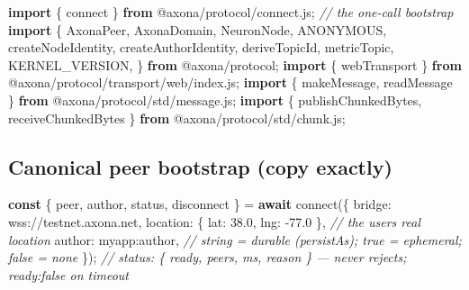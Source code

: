 \documentclass[
  nobib]{tufte-handout}
\newenvironment{Shaded}{}{}
\newcommand{\CommentTok}[1]{\textcolor[rgb]{0.38,0.63,0.69}{\textit{#1}}}
\newcommand{\ControlFlowTok}[1]{\textcolor[rgb]{0.00,0.44,0.13}{\textbf{#1}}}
\newcommand{\DataTypeTok}[1]{\textcolor[rgb]{0.56,0.13,0.00}{#1}}
\newcommand{\FloatTok}[1]{\textcolor[rgb]{0.25,0.63,0.44}{#1}}
\newcommand{\FunctionTok}[1]{\textcolor[rgb]{0.02,0.16,0.49}{#1}}
\newcommand{\ImportTok}[1]{\textcolor[rgb]{0.00,0.50,0.00}{\textbf{#1}}}
\newcommand{\KeywordTok}[1]{\textcolor[rgb]{0.00,0.44,0.13}{\textbf{#1}}}
\newcommand{\NormalTok}[1]{#1}
\newcommand{\OperatorTok}[1]{\textcolor[rgb]{0.40,0.40,0.40}{#1}}
\newcommand{\StringTok}[1]{\textcolor[rgb]{0.25,0.44,0.63}{#1}}
\newcounter{none} %
\begin{document}
\begin{Shaded}
\begin{Highlighting}[]
\ImportTok{import}\NormalTok{ \{ connect \} }\ImportTok{from} \StringTok{\textquotesingle{}@axona/protocol/connect.js\textquotesingle{}}\OperatorTok{;}   \CommentTok{// the one{-}call bootstrap}
\ImportTok{import}\NormalTok{ \{}
\NormalTok{  AxonaPeer}\OperatorTok{,}\NormalTok{ AxonaDomain}\OperatorTok{,}\NormalTok{ NeuronNode}\OperatorTok{,}\NormalTok{ ANONYMOUS}\OperatorTok{,}
\NormalTok{  createNodeIdentity}\OperatorTok{,}\NormalTok{ createAuthorIdentity}\OperatorTok{,}
\NormalTok{  deriveTopicId}\OperatorTok{,}\NormalTok{ metricTopic}\OperatorTok{,}\NormalTok{ KERNEL\_VERSION}\OperatorTok{,}
\NormalTok{\} }\ImportTok{from} \StringTok{\textquotesingle{}@axona/protocol\textquotesingle{}}\OperatorTok{;}
\ImportTok{import}\NormalTok{ \{ webTransport \} }\ImportTok{from} \StringTok{\textquotesingle{}@axona/protocol/transport/web/index.js\textquotesingle{}}\OperatorTok{;}
\ImportTok{import}\NormalTok{ \{ makeMessage}\OperatorTok{,}\NormalTok{ readMessage \} }\ImportTok{from} \StringTok{\textquotesingle{}@axona/protocol/std/message.js\textquotesingle{}}\OperatorTok{;}
\ImportTok{import}\NormalTok{ \{ publishChunkedBytes}\OperatorTok{,}\NormalTok{ receiveChunkedBytes \} }\ImportTok{from} \StringTok{\textquotesingle{}@axona/protocol/std/chunk.js\textquotesingle{}}\OperatorTok{;}
\end{Highlighting}
\end{Shaded}

\subsection{Canonical peer bootstrap (copy
exactly)}\label{canonical-peer-bootstrap-copy-exactly}

\begin{Shaded}
\begin{Highlighting}[]
\KeywordTok{const}\NormalTok{ \{ peer}\OperatorTok{,}\NormalTok{ author}\OperatorTok{,}\NormalTok{ status}\OperatorTok{,}\NormalTok{ disconnect \} }\OperatorTok{=} \ControlFlowTok{await} \FunctionTok{connect}\NormalTok{(\{}
  \DataTypeTok{bridge}\OperatorTok{:}   \StringTok{\textquotesingle{}wss://testnet.axona.net\textquotesingle{}}\OperatorTok{,}
  \DataTypeTok{location}\OperatorTok{:}\NormalTok{ \{ }\DataTypeTok{lat}\OperatorTok{:} \FloatTok{38.0}\OperatorTok{,} \DataTypeTok{lng}\OperatorTok{:} \OperatorTok{{-}}\FloatTok{77.0}\NormalTok{ \}}\OperatorTok{,}   \CommentTok{// the user\textquotesingle{}s real location}
  \DataTypeTok{author}\OperatorTok{:}   \StringTok{\textquotesingle{}myapp:author\textquotesingle{}}\OperatorTok{,}              \CommentTok{// string = durable (persistAs); true = ephemeral; false = none}
\NormalTok{\})}\OperatorTok{;}
\CommentTok{// status: \{ ready, peers, ms, reason \} — never rejects; ready:false on timeout}
\end{Highlighting}
\end{Shaded}
\end{document}
